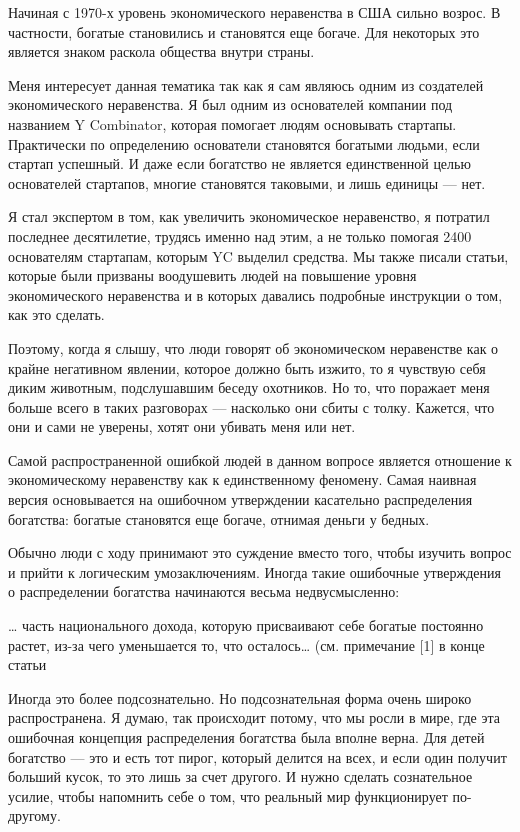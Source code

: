 \documentclass[ebook,12pt,oneside,openany]{memoir}
\date{}
\begin{document}
\maketitle

Начиная с 1970-х уровень экономического неравенства в США сильно
возрос. В частности, богатые становились и становятся еще богаче. Для
некоторых это является знаком раскола общества внутри страны.

Меня интересует данная тематика так как я сам являюсь одним из
создателей экономического неравенства. Я был одним из основателей
компании под названием Y Combinator, которая помогает людям основывать
стартапы. Практически по определению основатели становятся богатыми
людьми, если стартап успешный. И даже если богатство не является
единственной целью основателей стартапов, многие становятся таковыми,
и лишь единицы — нет.

Я стал экспертом в том, как увеличить экономическое неравенство, я
потратил последнее десятилетие, трудясь именно над этим, а не только
помогая 2400 основателям стартапам, которым YC выделил средства. Мы
также писали статьи, которые были призваны воодушевить людей на
повышение уровня экономического неравенства и в которых давались
подробные инструкции о том, как это сделать.

Поэтому, когда я слышу, что люди говорят об экономическом неравенстве
как о крайне негативном явлении, которое должно быть изжито, то я
чувствую себя диким животным, подслушавшим беседу охотников. Но то,
что поражает меня больше всего в таких разговорах — насколько они
сбиты с толку. Кажется, что они и сами не уверены, хотят они убивать
меня или нет.

Самой распространенной ошибкой людей в данном вопросе является
отношение к экономическому неравенству как к единственному феномену.
Самая наивная версия основывается на ошибочном утверждении касательно
распределения богатства: богатые становятся еще богаче, отнимая деньги
у бедных.

Обычно люди с ходу принимают это суждение вместо того, чтобы изучить
вопрос и прийти к логическим умозаключениям. Иногда такие ошибочные
утверждения о распределении богатства начинаются весьма
недвусмысленно:

… часть национального дохода, которую присваивают себе богатые
постоянно растет, из-за чего уменьшается то, что осталось… (см.
примечание [1] в конце статьи

Иногда это более подсознательно. Но подсознательная форма очень широко
распространена. Я думаю, так происходит потому, что мы росли в мире,
где эта ошибочная концепция распределения богатства была вполне верна.
Для детей богатство — это и есть тот пирог, который делится на всех, и
если один получит больший кусок, то это лишь за счет другого. И нужно
сделать сознательное усилие, чтобы напомнить себе о том, что реальный
мир функционирует по-другому.
\end{document}

